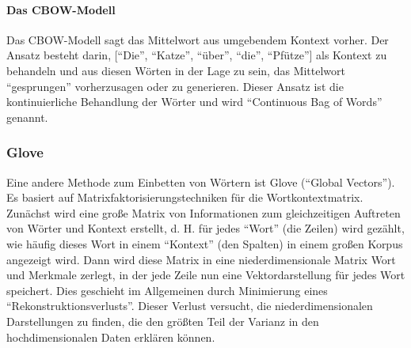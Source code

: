 \paragraph{Das CBOW-Modell}
Das CBOW-Modell sagt das Mittelwort aus umgebendem Kontext vorher. Der Ansatz besteht darin, [\enquote{Die}, \enquote{Katze}, \enquote{über}, \enquote{die}, \enquote{Pfütze}] als Kontext zu behandeln und aus diesen Wörten in der Lage zu sein, das Mittelwort \enquote{gesprungen} vorherzusagen oder zu generieren. Dieser Ansatz ist die kontinuierliche Behandlung der Wörter und wird \enquote{Continuous Bag of Words} genannt.





\subsubsection{Glove}
Eine andere Methode zum Einbetten von Wörtern ist Glove (\enquote{Global Vectors}). Es basiert auf Matrixfaktorisierungstechniken für die Wortkontextmatrix. Zunächst wird eine große Matrix von Informationen zum gleichzeitigen Auftreten von Wörter und Kontext erstellt, d. H. für jedes \enquote{Wort} (die Zeilen) wird gezählt, wie häufig dieses Wort in einem \enquote{Kontext} (den Spalten) in einem großen Korpus angezeigt wird. Dann wird diese Matrix in eine niederdimensionale Matrix Wort und Merkmale zerlegt, in der jede Zeile nun eine Vektordarstellung für jedes Wort speichert. Dies geschieht im Allgemeinen durch Minimierung eines \enquote{Rekonstruktionsverlusts}. Dieser Verlust versucht, die niederdimensionalen Darstellungen zu finden, die den größten Teil der Varianz in den hochdimensionalen Daten erklären können.





